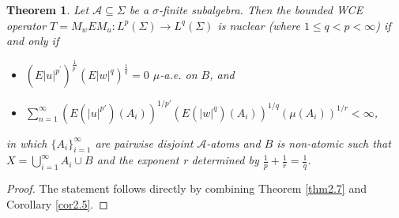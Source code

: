 \documentclass{amsart}
\newtheorem{thm}{Theorem}[section]
\theoremstyle{definition}\newtheorem{defn}[thm]{Definition}
\theoremstyle{remark}
\numberwithin{equation}{section}
\newcommand{\A}{\mathcal{A}}
\begin{document}
\begin{thm}\label{thm2.9}
	Let $\A \subseteq \Sigma$ be a $\sigma$-finite subalgebra. Then the bounded WCE operator $T = M_w E M_u : L^p(\Sigma) \to L^q(\Sigma)$ is nuclear (where  $1 \leq q<p < \infty$) if and only if
	\begin{itemize}
		\item[(i)] $(E|u|^{p^{\prime}})^{\frac{1}{p^{\prime}}}(E|w|^{q})^{\frac{1}{q}} = 0$ $\mu$-a.e. on $B$, and
		\item[(ii)]
		 $\sum_{n=1}^{\infty} (E(|u|^{p'})(A_i))^{1/{p'}} (E(|w|^q)(A_i))^{1/q} (\mu(A_i))^{1/r} < \infty$,
	\end{itemize}
	in which $\{A_i\}_{i=1}^{\infty}$ are pairwise disjoint $\A$-atoms and $B$ is non-atomic such that $X = \bigcup_{i=1}^{\infty} A_i \cup B$ and the exponent r determined by $\frac{1}{p} + \frac{1}{r} = \frac{1}{q}$.
\end{thm}

\begin{proof}
	The statement follows directly by combining Theorem \ref{thm2.7} and Corollary \ref{cor2.5}.
\end{proof}
\end{document}
